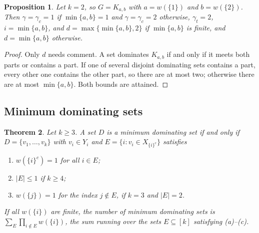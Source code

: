 \documentclass[11pt]{amsart}
\newtheorem{theorem}{Theorem}[section]
\newtheorem{proposition}[theorem]{Proposition}
\theoremstyle{definition}
\theoremstyle{remark}
\newcommand{\co}[1]{{#1}^{c}}
\begin{document}
\begin{proposition}\label{prop:k2-abstract}
Let $k=2$, so $G=K_{a,b}$ with $a=w(\{1\})$ and $b=w(\{2\})$. Then $\gamma=\gamma_c=1$ if
$\min\{a,b\}=1$ and $\gamma=\gamma_c=2$ otherwise, $\gamma_t=2$, $i=\min\{a,b\}$, and
$d=\max\{\min\{a,b\},2\}$ if $\min\{a,b\}$ is finite, and $d=\min\{a,b\}$ otherwise.
\end{proposition}

\begin{proof}
Only $d$ needs comment. A set dominates $K_{a,b}$ if and only if it meets both parts or contains a
part. If one of several disjoint dominating sets contains a part, every other one contains the other
part, so there are at most two; otherwise there are at most $\min\{a,b\}$. Both bounds are attained.
\end{proof}

\subsection{Minimum dominating sets}

\begin{theorem}\label{thm:gamma-sets}
Let $k\ge3$. A set $D$ is a minimum dominating set if and only if $D=\{v_1,\dots,v_k\}$ with
$v_i\in Y_i$ and $E=\{i:v_i\in X_{\co{\{i\}}}\}$ satisfies
\begin{enumerate}[label=\textup{(\alph*)}]
\item $w(\co{\{i\}})=1$ for all $i\in E$;
\item $|E|\le1$ if $k\ge4$;
\item $w(\{j\})=1$ for the index $j\notin E$, if $k=3$ and $|E|=2$.
\end{enumerate}
If all $w(\{i\})$ are finite, the number of minimum dominating sets is
$\sum_E\prod_{i\notin E}w(\{i\})$, the sum running over the sets $E\subseteq[k]$ satisfying
\textup{(a)--(c)}.
\end{theorem}
\end{document}

